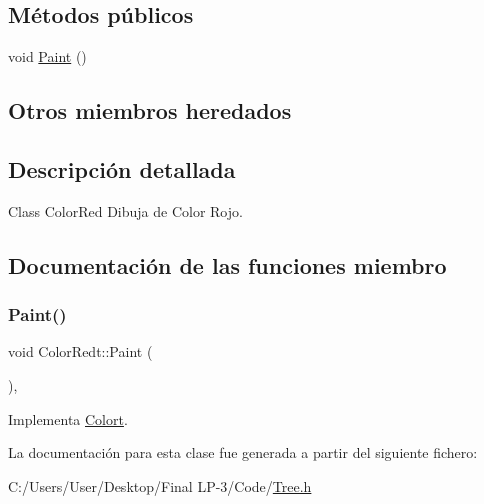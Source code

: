 \subsection*{Métodos públicos}
\begin{DoxyCompactItemize}
\item 
void \mbox{\hyperlink{class_color_redt_aef9b124cacb351efc13db470580f6ca2}{Paint}} ()
\end{DoxyCompactItemize}
\subsection*{Otros miembros heredados}


\subsection{Descripción detallada}
Class Color\+Red Dibuja de Color Rojo. 

\subsection{Documentación de las funciones miembro}
\mbox{\label{class_color_redt_aef9b124cacb351efc13db470580f6ca2}} 
\subsubsection{\texorpdfstring{Paint()}{Paint()}}
{\footnotesize\ttfamily void Color\+Redt\+::\+Paint (\begin{DoxyParamCaption}{ }\end{DoxyParamCaption})\hspace{0.3cm}{\ttfamily [inline]}, {\ttfamily [virtual]}}



Implementa \mbox{\hyperlink{class_colort_aee987a82c2c47304d7406816d6ca0da7}{Colort}}.



La documentación para esta clase fue generada a partir del siguiente fichero\+:\begin{DoxyCompactItemize}
\item 
C\+:/\+Users/\+User/\+Desktop/\+Final L\+P-\/3/\+Code/\mbox{\hyperlink{_tree_8h}{Tree.\+h}}\end{DoxyCompactItemize}
